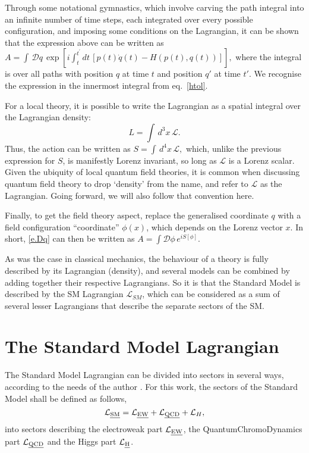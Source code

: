Through some notational gymnastics, which involve carving the path integral into an infinite number of time steps, each integrated over every possible configuration, and imposing some conditions on the Lagrangian, it can be shown \cite{srednicki} that the expression above can be written as
\(A=\int\,\mathcal Dq\,\exp\left[i\int_t^{t^\prime}dt\,[p(t)\dot q(t)-H(p(t),q(t))]\right],\label{e.Dq}\)
where the integral is over all paths with position $q$ at time $t$ and position $q\prime$ at time $t\prime$. We recognise the expression in the innermost integral from eq.~\eqref{htol}.

For a local theory, it is possible to write the Lagrangian as a spatial integral over the Lagrangian density:
\[L=\int \,d^3x\,\mathcal L.\]
Thus, the action can be written as
\(S=\int\,d^4x\,\mathcal L,\label{e.S}\)
which, unlike the previous expression for $S$, is manifestly Lorenz invariant, so long as $\mathcal L$ is a Lorenz scalar. Given the ubiquity of local quantum field theories, it is common when discussing quantum field theory to drop `density' from the name, and refer to $\mathcal L$ as the Lagrangian. Going forward, we will also follow that convention here.

Finally, to get the field theory aspect, replace the generalised coordinate $q$ with a field configuration ``coordinate'' $\phi(x)$, which depends on the Lorenz vector $x$. In short, \eqref{e.Dq} can then be written as
\(A=\int\mathcal D\phi\, e^{iS[\phi]}.\label{e.Dphi}\)

As was the case in classical mechanics, the behaviour of a theory is fully described by its Lagrangian (density), and several models can be combined by adding together their respective Lagrangians. So it is that the Standard Model is described by the SM Lagrangian $\mathcal L_{SM}$, which can be considered as a sum of several lesser Lagrangians that describe the separate sectors of the SM.

\section{The Standard Model Lagrangian}

The Standard Model Lagrangian can be divided into sectors in several ways, according to the needs of the author \cite{srednicki,wikism}. For this work, the sectors of the Standard Model shall be defined as follows,
\[\mathcal{L}_{\text{\emph{SM}}}=\mathcal{L}_{\text{\emph{EW}}}+\mathcal{L}_{\text{\emph{QCD}}}+\mathcal{L}_{H},\]
into sectors describing the electroweak part $\mathcal{L}_{\text{\emph{EW}}}$, the QuantumChromoDynamics part $\mathcal{L}_{\text{\emph{QCD}}}$ and the Higgs part $\mathcal{L}_{\text{\emph{H}}}$.

